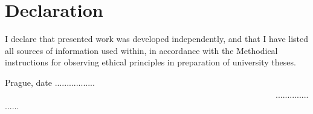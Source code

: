 
\vspace{10cm}

\section*{Declaration}
I declare that presented work was developed independently, and that I have listed all
sources of information used within, in accordance with the Methodical instructions for
observing ethical principles in preparation of university theses.

\vspace{2cm}
Prague, date ................. \ \ \ \ \ \ \ \ \ \ \ \ \ \ \ \ \ \ \ \ \ \ \ \ \ \ \ \ \ \ \ \ \ \ \ \ \ \ \ \ \ \ \ \ \ \ \ \ \ \ \ \ \ \ \ \ \ \ \ \ \ \ \ \ ....................





